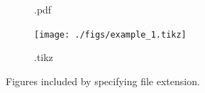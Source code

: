 \begin{figure}
\begin{subfigure}[t]{0.32\textwidth}
        \caption{.pdf}
        \label{figures:fig:exmaple:2:b}
        \end{subfigure}
        \begin{subfigure}[t]{0.32\textwidth}
        \texttt{[image: ./figs/example\_1.tikz]}
        \caption{.tikz}
        \label{figures:fig:exmaple:2:c}
        \end{subfigure}     
        \caption{Figures included by specifying file extension.}   
        \label{figures:fig:example:2}
    \end{figure}


